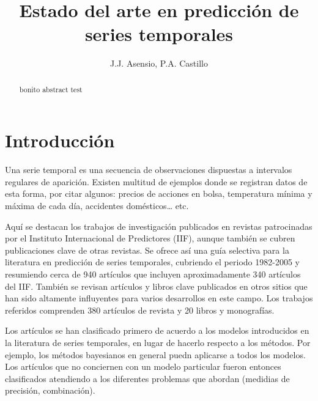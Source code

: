 \documentclass{llncs}
\begin{document}

\title{Estado del arte en predicción de series temporales}


\author{J.J. Asensio, P.A. Castillo}

\maketitle
%
%
\begin{abstract} 
bonito abstract test
\end{abstract}


%
%
\section{Introducción}
\label{sec:intro}
Una serie temporal es una secuencia de observaciones dispuestas a intervalos regulares de aparición. Existen multitud de ejemplos donde se registran datos de esta forma, por citar algunos: precios de acciones en bolsa, temperatura mínima y máxima de cada día, accidentes domésticos… etc.

Aquí se destacan los trabajos de investigación publicados en revistas patrocinadas por el Instituto Internacional de Predictores (IIF), aunque también se cubren publicaciones clave de otras revistas. Se ofrece así una guía selectiva para la literatura en predicción de series temporales, cubriendo el periodo 1982-2005 y resumiendo cerca de 940 artículos que incluyen aproximadamente 340 artículos del IIF. También se revisan artículos y libros clave publicados en otros sitios que han sido altamente influyentes para varios desarrollos en este campo. Los trabajos referidos comprenden 380 artículos de revista y 20 libros y monografías. 

Los artículos se han clasificado primero de acuerdo a los modelos introducidos en la literatura de series temporales, en lugar de hacerlo respecto a los métodos. Por ejemplo, los métodos bayesianos en general puedn aplicarse a todos los modelos. Los artículos que no conciernen con un modelo particular fueron entonces clasificados atendiendo a los diferentes problemas que abordan (medidias de precisión, combinación). 
\end{document}
